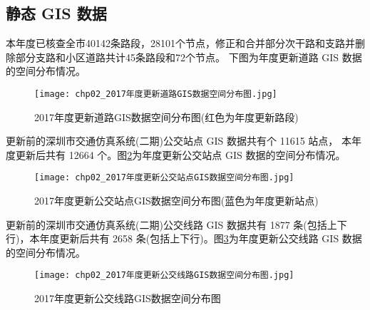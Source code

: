 \subsection{静态 GIS 数据}
本年度已核查全市40142条路段，28101个节点，修正和合并部分次干路和支路并删除部分支路和小区道路共计45条路段和72个节点。
下图为年度更新道路 GIS 数据的空间分布情况。

\begin{figure}[ht]
  \centering
  \texttt{[image: chp02\_2017年度更新道路GIS数据空间分布图.jpg]}
  \caption[2017年度更新道路GIS数据空间分布图]{2017年度更新道路GIS数据空间分布图(红色为年度更新路段)\label{fig:2017年度更新道路GIS数据空间分布图}}
\end{figure}

更新前的深圳市交通仿真系统(二期)公交站点 GIS 数据共有个 11615 站点，
本年度更新后共有 12664 个。图\ref{fig:2017年度更新公交站点GIS数据空间分布图}为年度更新公交站点 GIS 数据的空间分布情况。

\begin{figure}[ht]
  \centering
  \texttt{[image: chp02\_2017年度更新公交站点GIS数据空间分布图.jpg]}
  \caption[2017年度更新公交站点GIS数据空间分布图]{2017年度更新公交站点GIS数据空间分布图(蓝色为年度更新站点)\label{fig:2017年度更新公交站点GIS数据空间分布图}}
\end{figure}

更新前的深圳市交通仿真系统(二期)公交线路 GIS 数据共有 1877 条(包括上下行)，本年度更新后共有 2658 条(包括上下行)。图\ref{fig:2017年度更新公交线路GIS数据空间分布图}为年度更新公交线路 GIS 数据的空间分布情况。

\begin{figure}[ht]
  \centering
  \texttt{[image: chp02\_2017年度更新公交线路GIS数据空间分布图.jpg]}
  \caption{2017年度更新公交线路GIS数据空间分布图\label{fig:2017年度更新公交线路GIS数据空间分布图}}
\end{figure}

